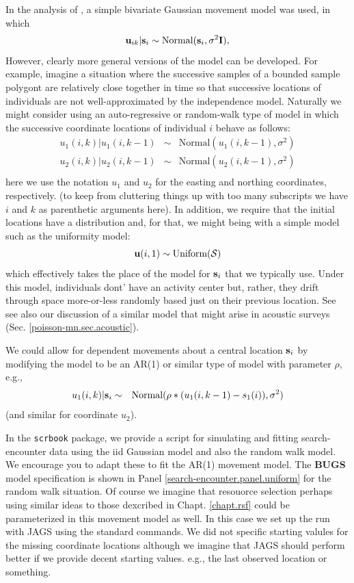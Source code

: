 In the analysis of \citet{royle_young:2008}, a simple bivariate
Gaussian movement model was used, in which
\[
 {\bf u}_{ik} | {\bf s}_{i} \sim \mbox{Normal}({\bf s}_{i}, \sigma^{2}{\bf I}),
\]
However, clearly more general versions of the model can be developed.
For example, imagine a situation where the successive samples of a
bounded sample polygont are relatively close together in time so that
successive locations of individuals are not well-approximated by the
independence model. Naturally we might consider using an
auto-regressive or random-walk type of model in which
the successive coordinate locations of individual $i$ behave as follows:
\begin{eqnarray*}
 u_{1}(i,k) | u_{1}(i,k-1) &\sim &  \mbox{Normal}( u_{1}(i,k-1),  \sigma^{2}) \\
 u_{2}(i,k) | u_{2}(i,k-1) &\sim &  \mbox{Normal}( u_{2}(i,k-1),  \sigma^{2}) \\
\end{eqnarray*}
here we use the notation $u_{1}$ and $u_{2}$ for the easting and
northing coordinates, respectively. (to keep from cluttering things up
with too many subscripts we have $i$ and $k$ as parenthetic arguments
here).   In addition, we require that the initial locations have a
distribution and, for that, we might being with a simple model such as
the uniformity model:
\[
 {\bf u}(i,1) \sim \mbox{Uniform}({\cal S})
\]
which effectively takes the place of the model for ${\bf s}_{i}$ that
we typically use. Under this model, individuals dont' have an activity
center but, rather, they drift through space more-or-less randomly
based just on their previous location. See \citet{ovaskainen:2004,
ovaskainen:2008}
see also our discussion of a similar model that might
arise in acoustic  surveys (Sec. \ref{poisson-mn.sec.acoustic}).

We could allow for dependent movements about a central location ${\bf
  s}_{i}$ by modifying the model to be an AR(1) or similar type of
model with parameter $\rho$, e.g.,
\begin{eqnarray*}
 u_{1}(i,k) | {\bf s}_{i} &\sim &  \mbox{Normal}( \rho*( u_{1}(i,k-1)
 - s_{1}(i) ),  \sigma^{2}) \\
\end{eqnarray*}
(and similar for coordinate $u_{2}$).

In the \mbox{\tt scrbook} package, we provide a script for
simulating and fitting search-encounter data using the iid Gaussian
model and also the random walk model. We encourage you to adapt these
to fit the AR(1) movement model.   The {\bf BUGS} model specification
is shown in Panel \ref{search-encounter.panel.uniform} for the random
walk situation.  Of course we imagine that resouorce selection
perhaps using similar ideas to those dexcribed in
Chapt. \ref{chapt.rsf} could be parameterized in this movement model
as well. In this case we set up the run with JAGS using the standard
commands. We did not specific starting valules for the missing
coordinate locations although we imagine that JAGS should perform
better if we provide decent starting values. e.g., the last observed
location or something.

